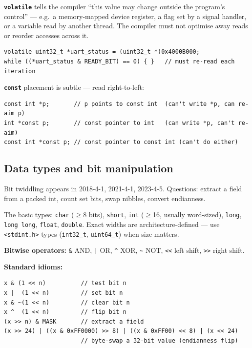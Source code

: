\documentclass[11pt,a4paper]{article}
\begin{document}
\textbf{\texttt{volatile}} tells the compiler ``this value may change outside the program's control'' --- e.g.\ a memory-mapped device register, a flag set by a signal handler, or a variable read by another thread. The compiler must not optimise away reads or reorder accesses across it.

\begin{lstlisting}
volatile uint32_t *uart_status = (uint32_t *)0x4000B000;
while ((*uart_status & READY_BIT) == 0) { }   // must re-read each iteration
\end{lstlisting}

\textbf{\texttt{const}} placement is subtle --- read right-to-left:
\begin{lstlisting}
const int *p;       // p points to const int  (can't write *p, can re-aim p)
int *const p;       // const pointer to int   (can write *p, can't re-aim)
const int *const p; // const pointer to const int (can't do either)
\end{lstlisting}

\subsection{Data types and bit manipulation}

\begin{useful}
Bit twiddling appears in 2018-4-1, 2021-4-1, 2023-4-5. Questions: extract a field from a packed int, count set bits, swap nibbles, convert endianness.
\end{useful}

The basic types: \verb|char| ($\ge$8 bits), \verb|short|, \verb|int| ($\ge$16, usually word-sized), \verb|long|, \verb|long long|, \verb|float|, \verb|double|. Exact widths are architecture-defined --- use \texttt{<stdint.h>} types (\verb|int32_t|, \verb|uint64_t|) when size matters.

\textbf{Bitwise operators:} \verb|&| AND, \verb#|# OR, \verb|^| XOR, \verb|~| NOT, \verb|<<| left shift, \verb|>>| right shift.

\textbf{Standard idioms:}
\begin{lstlisting}
x & (1 << n)          // test bit n
x |  (1 << n)         // set bit n
x & ~(1 << n)         // clear bit n
x ^  (1 << n)         // flip bit n
(x >> n) & MASK       // extract a field
(x >> 24) | ((x & 0xFF0000) >> 8) | ((x & 0xFF00) << 8) | (x << 24)
                      // byte-swap a 32-bit value (endianness flip)
\end{lstlisting}
\end{document}
